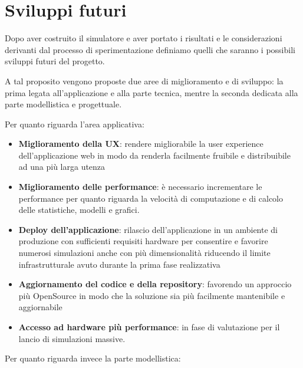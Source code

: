 \section{Sviluppi futuri}

    Dopo aver costruito il simulatore e aver portato i risultati e le considerazioni derivanti dal processo di sperimentazione definiamo quelli che saranno i possibili sviluppi futuri del progetto.
    
    A tal proposito vengono proposte due aree di miglioramento e di sviluppo: la prima legata all'applicazione e alla parte tecnica, mentre la seconda dedicata alla parte modellistica e progettuale.
    
    Per quanto riguarda l'area applicativa:
    \begin{itemize}
        \item \textbf{Miglioramento della UX}: rendere migliorabile la user experience dell'applicazione web in modo da renderla facilmente fruibile e distribuibile ad una più larga utenza
        \item \textbf{Miglioramento delle performance}:  è necessario incrementare le performance per quanto riguarda la velocità di computazione e di calcolo delle statistiche, modelli e grafici.
        \item \textbf{Deploy dell'applicazione}: rilascio dell'applicazione in un ambiente di produzione con sufficienti requisiti hardware per consentire e favorire numerosi simulazioni anche con più dimensionalità riducendo il limite infrastrutturale avuto durante la prima fase realizzativa
        \item \textbf{Aggiornamento del codice e della repository}: favorendo un approccio più OpenSource in modo che la soluzione sia più facilmente mantenibile e aggiornabile
        \item \textbf{Accesso ad hardware più performance}: in fase di valutazione per il lancio di simulazioni massive.
    \end{itemize}
    
    Per quanto riguarda invece la parte modellistica:
    
